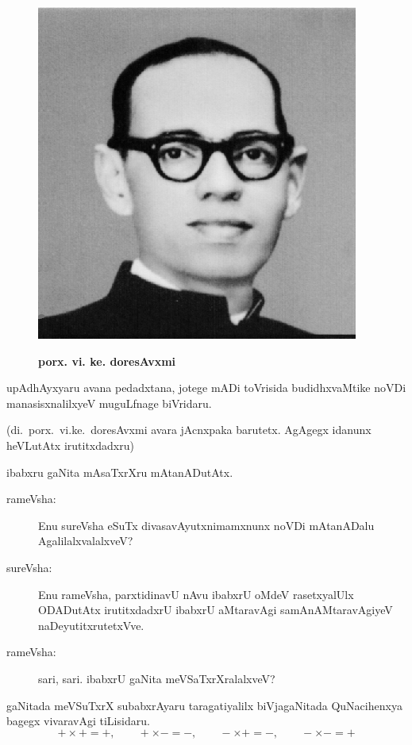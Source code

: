 \begin{figure}
\vskip -0.5cm
  \centering\includegraphics[scale=0.8]{src/figures/v_k_doreswamy.eps}
  
    {\bf porx. vi. ke. doresAvxmi}
    \end{figure}
    
upAdhAyxyaru avana pedadxtana, jotege mADi toVrisida budidhxvaMtike noVDi manasisx\-nalilxyeV muguLfnage biVridaru.

(di.\ porx.\ vi.ke.\ doresAvxmi avara jAcnxpaka barutetx. AgAgegx idanunx heVLutAtx irutitxdadxru)

\medskip

ibabxru gaNita mAsaTxrXru mAtanADutAtx.
\begin{description}
\item[rameVsha:] Enu sureVsha eSuTx divasavAyutx\break nimamxnunx noVDi mAtanADalu AgalilalxvalalxveV?

\item[sureVsha:] Enu rameVsha, parxtidinavU nAvu ibabxrU oMdeV rasetxyalUlx ODADutAtx irutitxdadxrU ibabxrU aMtaravAgi samAnAMtaravAgiyeV naDeyutitxrutetxVve.

\item[rameVsha:] sari, sari. ibabxrU gaNita meVSaTxrXralalxveV?
\end{description}


gaNitada meVSuTxrX subabxrAyaru taragatiyalilx biVjagaNitada QuNacihenxya bagegx vivaravAgi tiLisidaru.
$$
+\times+=+,\qquad +\times-=-,\qquad -\times+=-,\qquad -\times -=+
$$

